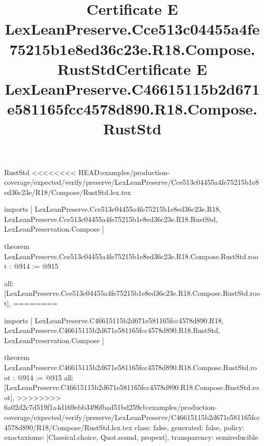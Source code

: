 \begin{lexlean}{RustStd}
<<<<<<<< HEAD:examples/production-coverage/expected/verify/preserve/LexLeanPreserve/Cce513c04455a4fe75215b1e8ed36c23e/R18/Compose/RustStd.lex.tex
\title{Certificate E LexLeanPreserve.Cce513c04455a4fe75215b1e8ed36c23e.R18.Compose.RustStd}
\begin{coremodule}
imports [
  LexLeanPreserve.Cce513c04455a4fe75215b1e8ed36c23e.R18,
  LexLeanPreserve.Cce513c04455a4fe75215b1e8ed36c23e.R18.RustStd,
  LexLeanPreservation.Compose
]

theorem LexLeanPreserve.Cce513c04455a4fe75215b1e8ed36c23e.R18.Compose.RustStd.root : @914 := @915 {
  all: [LexLeanPreserve.Cce513c04455a4fe75215b1e8ed36c23e.R18.Compose.RustStd.root],
========
\title{Certificate E LexLeanPreserve.C46615115b2d671e581165fcc4578d890.R18.Compose.RustStd}
\begin{coremodule}
imports [
  LexLeanPreserve.C46615115b2d671e581165fcc4578d890.R18,
  LexLeanPreserve.C46615115b2d671e581165fcc4578d890.R18.RustStd,
  LexLeanPreservation.Compose
]

theorem LexLeanPreserve.C46615115b2d671e581165fcc4578d890.R18.Compose.RustStd.root : @914 := @915 {
  all: [LexLeanPreserve.C46615115b2d671e581165fcc4578d890.R18.Compose.RustStd.root],
>>>>>>>> 6a02d2c7d519f1a4d169ebb3496fbad51bd259cb:examples/production-coverage/expected/verify/preserve/LexLeanPreserve/C46615115b2d671e581165fcc4578d890/R18/Compose/RustStd.lex.tex
  class: false,
  generated: false,
  policy: exact{axioms: [Classical.choice, Quot.sound, propext]},
  transparency: semireducible
}


\end{coremodule}}
\end{coremodule}
\end{lexlean}
